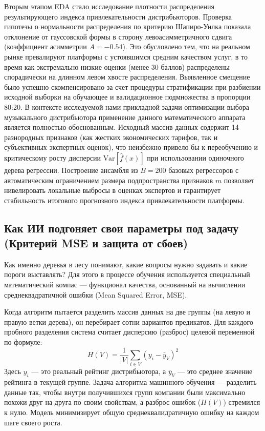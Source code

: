 \documentclass[14pt, a4paper]{extarticle}
\begin{document}
Вторым этапом EDA стало исследование плотности распределения результирующего индекса привлекательности дистрибьюторов. Проверка гипотезы о нормальности распределения по критерию Шапиро-Уилка показала отклонение от гауссовской формы в сторону левоасимметричного сдвига (коэффициент асимметрии $A = -0.54$). Это обусловлено тем, что на реальном рынке превалируют платформы с устоявшимся средним качеством услуг, в то время как экстремально низкие оценки (менее 30 баллов) распределены спорадически на длинном левом хвосте распределения. Выявленное смещение было успешно скомпенсировано за счет процедуры стратификации при разбиении исходной выборки на обучающее и валидационное подмножества в пропорции 80:20.
В контексте исследуемой нами прикладной задачи оптимизации выбора музыкального дистрибьютора применение данного математического аппарата является полностью обоснованным. Исходный массив данных содержит 14 разнородных признаков (как жестких экономических тарифов, так и субъективных экспертных оценок), что неизбежно привело бы к переобучению и критическому росту дисперсии $\text{Var}[\hat{f}(x)]$ при использовании одиночного дерева регрессии. Построение ансамбля из $B = 200$ базовых регрессоров с автоматическим ограничением размера подпространства признаков $m$ позволяет нивелировать локальные выбросы в оценках экспертов и гарантирует стабильность итогового прогнозного индекса привлекательности платформы.

\subsection{Как ИИ подгоняет свои параметры под задачу (Критерий MSE и защита от сбоев)}
Как именно деревья в лесу понимают, какие вопросы нужно задавать и какие пороги выставлять? Для этого в процессе обучения используется специальный математический компас — функционал качества, основанный на вычислении среднеквадратичной ошибки (Mean Squared Error, MSE).

Когда алгоритм пытается разделить массив данных на две группы (на левую и правую ветки дерева), он перебирает сотни вариантов предикатов. Для каждого пробного разделения система считает дисперсию (разброс) целевой переменной по формуле:
\begin{equation}\label{node_impurity_simple}
H(V) = \frac{1}{|V|} \sum_{i \in V} (y_i - \bar{y}_V)^2
\end{equation}
Здесь $y_i$ — это реальный рейтинг дистрибьютора, а $\bar{y}_V$ — это среднее значение рейтинга в текущей группе. Задача алгоритма машинного обучения — разделить данные так, чтобы внутри получившихся групп компании были максимально похожи друг на друга по своим свойствам, а разброс ошибок ($H(V)$) стремился к нулю. Модель минимизирует общую среднеквалидратичную ошибку на каждом шаге своего роста.
\end{document}
